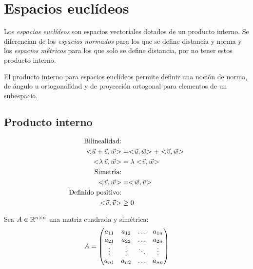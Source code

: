 \chapter{Espacios euclídeos}

Los \emph{espacios euclídeos} son espacios vectoriales dotados de un producto interno.
Se diferencian de los \emph{espacios normados} para los que se define distancia y norma y los \emph{espacios métricos} para los que solo se define distancia, por no tener estos producto interno.

El producto interno para espacios euclídeos permite definir una noción de norma, de ángulo u ortogonalidad y de proyección ortogonal para elementos de un subespacio.


\section{Producto interno}

\begin{mdframed}[style=DefinitionFrame]
    \begin{defn}
        \label{defn:intProd}
    \end{defn}
    \begin{align*}
        \textrm{Bilinealidad:} &
        \\
        \intProd{\Vec{u}+\Vec{v}}{\Vec{w}} &= \intProd{\Vec{u}}{\Vec{w}} + \intProd{\Vec{v}}{\Vec{w}}
        \\
        \intProd{\lambda \, \Vec{v}}{\Vec{w}} &= \lambda \intProd{\Vec{v}}{\Vec{w}}
        \\
        \textrm{Simetría:} &
        \\
        \intProd{\Vec{v}}{\Vec{w}} &= \intProd{\Vec{w}}{\Vec{v}}
        \\
        \textrm{Definido positivo:} &
        \\
        \intProd{\Vec{v}}{\Vec{v}} &\geq 0
    \end{align*}
\end{mdframed}

Sea $A\in\mathbb{R}^{n\times n}$ una matriz cuadrada y simétrica:
\begin{equation*}
    A =
    \begin{pmatrix}
        a_{11} & a_{12} & \dots & a_{1n}
        \\
        a_{21} & a_{22} & \dots & a_{2n}
        \\
        \vdots & \vdots & \ddots & \vdots
        \\
        a_{n 1} & a_{n 2} & \dots & a_{n n}
    \end{pmatrix}
\end{equation*}

